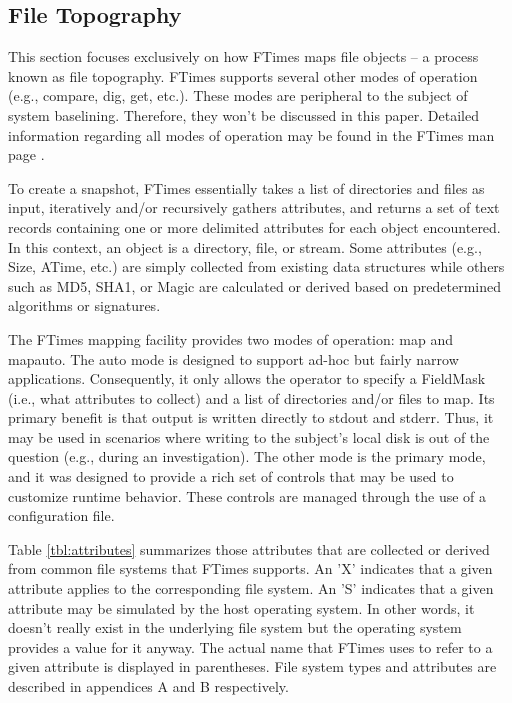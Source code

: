 \documentclass[10pt]{article}
\begin{document}
\subsection{File Topography}

This section focuses exclusively on how FTimes maps file objects -- a
process known as file topography.  FTimes supports several other modes
of operation (e.g., compare, dig, get, etc.).  These modes are
peripheral to the subject of system baselining.  Therefore, they won't
be discussed in this paper.  Detailed information regarding all modes
of operation may be found in the FTimes man page \cite{ftimes}.

To create a snapshot, FTimes essentially takes a list of directories
and files as input, iteratively and/or recursively gathers attributes,
and returns a set of text records containing one or more delimited
attributes for each object encountered.  In this context, an object is
a directory, file, or stream.  Some attributes (e.g., Size, ATime,
etc.) are simply collected from existing data structures while others
such as MD5, SHA1, or Magic are calculated or derived based on
predetermined algorithms or signatures.

The FTimes mapping facility provides two modes of operation: map and
mapauto.  The auto mode is designed to support ad-hoc but fairly
narrow applications.  Consequently, it only allows the operator to
specify a FieldMask (i.e., what attributes to collect) and a list of
directories and/or files to map.  Its primary benefit is that output
is written directly to stdout and stderr.  Thus, it may be used in
scenarios where writing to the subject's local disk is out of the
question (e.g., during an investigation).  The other mode is the
primary mode, and it was designed to provide a rich set of controls
that may be used to customize runtime behavior.  These controls are
managed through the use of a configuration file.

Table \ref{tbl:attributes} summarizes those attributes that are
collected or derived from common file systems that FTimes supports.
An 'X' indicates that a given attribute applies to the corresponding
file system.  An 'S' indicates that a given attribute may be simulated
by the host operating system.  In other words, it doesn't really exist
in the underlying file system but the operating system provides a
value for it anyway.  The actual name that FTimes uses to refer to a
given attribute is displayed in parentheses.  File system types and
attributes are described in appendices A and B respectively.
\end{document}
